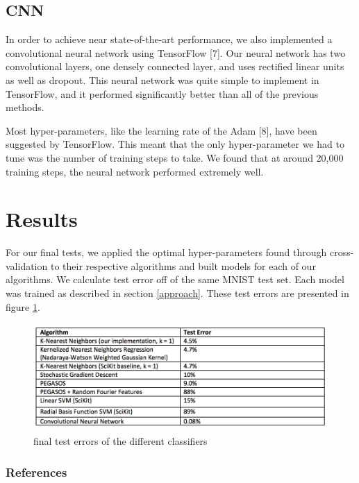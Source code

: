 \documentclass{article} %
\begin{document}
\subsection{CNN}
In order to achieve near state-of-the-art performance, we also implemented a
convolutional neural network using TensorFlow [7]. Our neural network has two
convolutional layers, one densely connected layer, and uses rectified linear
units as well as dropout. This neural network was quite simple to implement in
TensorFlow, and it performed significantly better than all of the previous methods.

Most hyper-parameters, like the learning rate of the Adam [8], have been
suggested by TensorFlow. This meant that the only hyper-parameter we had to tune
was the number of training steps to take. We found that at around 20,000 training
steps, the neural network performed extremely well.

\section{Results} \label{results}

For our final tests, we applied the optimal hyper-parameters found through cross-validation
to their respective algorithms and built models for
each of our algorithms. We calculate test error off of the same MNIST test set.
Each model was trained as described in section \ref{approach}. These test errors
are presented in figure \ref{fig:test-results}.

\begin{figure}[h]
\centering
\includegraphics[width=\textwidth]{test-results.png}
\caption{final test errors of the different classifiers}
\label{fig:test-results}
\end{figure}


\subsubsection*{References}
\end{document}
